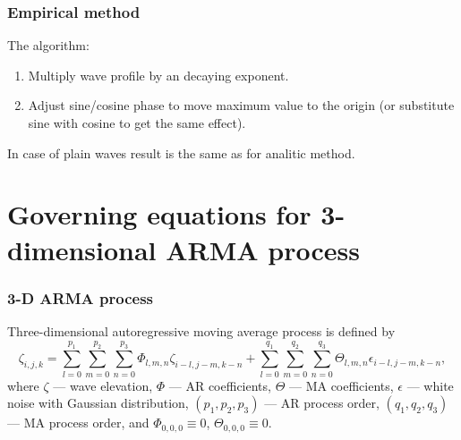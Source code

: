 \documentclass[14pt,aspectratio=169]{beamer}
\begin{document}
	\begin{frame}
		\frametitle{Empirical method}
		The algorithm:
		\begin{enumerate}
			\item Multiply wave profile by an decaying exponent.
			\item Adjust sine/cosine phase to move maximum value to the origin
				  (or substitute sine with cosine to get the same effect).
		\end{enumerate}
		\vfill%
		In case of plain waves result is the same as for analitic method.
	\end{frame}

	\section{Governing equations for 3-dimensional ARMA process}

	\begin{frame}
		\frametitle{3-D ARMA process}
		Three-dimensional autoregressive moving average process is defined by
		\begin{equation*}
			\zeta_{i,j,k} =
			\sum\limits_{l=0}^{p_1}
			\sum\limits_{m=0}^{p_2}
			\sum\limits_{n=0}^{p_3}
			\Phi_{l,m,n} \zeta_{i-l,j-m,k-n}
			+
			\sum\limits_{l=0}^{q_1}
			\sum\limits_{m=0}^{q_2}
			\sum\limits_{n=0}^{q_3}
			\Theta_{l,m,n} \epsilon_{i-l,j-m,k-n}
			,
			\label{eq:arma-process}
		\end{equation*}
		\small{%
			where $\zeta$ --- wave elevation, $\Phi$ --- AR coefficients, $\Theta$ --- MA
			coefficients, \newline$\epsilon$ --- white noise with Gaussian distribution,
			$(p_1,p_2,p_3)$ --- AR process order, $(q_1,q_2,q_3)$ --- MA process order, and
			$\Phi_{0,0,0} \equiv 0$, $\Theta_{0,0,0} \equiv 0$.%
		}
	\end{frame}
\end{document}
